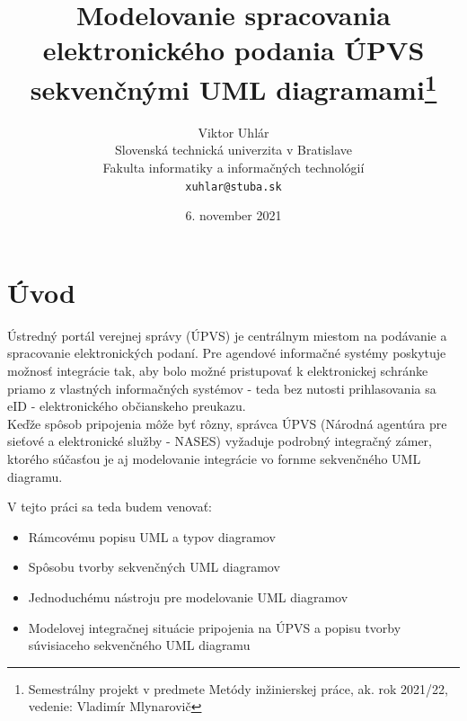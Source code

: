 \documentclass[10pt,twoside,slovak,a4paper]{article}
\title{{\bf Modelovanie spracovania elektronického podania ÚPVS sekvenčnými UML diagramami}\thanks{Semestrálny projekt v predmete Metódy inžinierskej práce, ak. rok 2021/22, vedenie: Vladimír Mlynarovič}} %
\author{Viktor Uhlár\\[2pt]
	{\small Slovenská technická univerzita v Bratislave}\\
	{\small Fakulta informatiky a informačných technológií}\\
	{\small \texttt{xuhlar@stuba.sk}}
	}
\date{\small 6. november 2021}
\begin{document}
\begin {titlepage}
\centering
\maketitle

\begin{abstract}


\newline
{}

\end{abstract}

\end{titlepage}
\flushleft
\section{Úvod}\label{1sek}

Ústredný portál verejnej správy (ÚPVS) je centrálnym miestom na podávanie a spracovanie elektronických podaní. Pre agendové informačné systémy poskytuje možnosť integrácie tak, aby bolo možné pristupovať k elektronickej schránke priamo z vlastných informačných systémov - teda bez nutosti prihlasovania sa eID - elektronického občianskeho preukazu.\\

Keďže spôsob pripojenia môže byť rôzny, správca ÚPVS (Národná agentúra pre sieťové a elektronické služby - NASES) vyžaduje podrobný integračný zámer, ktorého súčasťou je aj modelovanie integrácie vo fornme sekvenčného UML diagramu.\newline

V tejto práci sa teda budem venovať:

\begin{itemize}
\item Rámcovému popisu UML a typov diagramov
\item Spôsobu tvorby sekvenčných UML diagramov
\item Jednoduchému nástroju pre modelovanie UML diagramov
\item Modelovej integračnej situácie pripojenia na ÚPVS a popisu tvorby súvisiaceho sekvenčného UML diagramu
\end{itemize}
\end{document}

